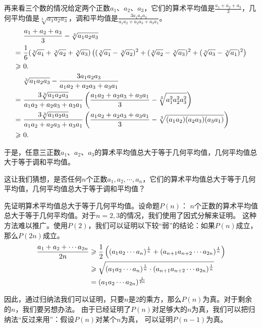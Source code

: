 \documentclass[12pt,UTF8]{ctexbook}
\begin{document}
再来看三个数的情况给定两个正数$a_1$、$a_2$、$a_3$，它们的算术平均值是$\frac{a_1 + a_2 + a_3}{3}$，几何平均值是$\sqrt[3]{a_1a_2a_3}$，调和平均值是$\frac{3a_1 a_2 a_3}{a_1 a_2 + a_2 a_3 + a_3 a_1}$。
\begin{align}
    &\frac{a_1 + a_2 + a_3}{3} - \sqrt[3]{a_1a_2a_3} \notag \\
    =\,\,& \frac{1}{6}(\sqrt[3]{a_1} + \sqrt[3]{a_2} + \sqrt[3]{a_3})\left((\sqrt[3]{a_1} - \sqrt[3]{a_2})^2 + (\sqrt[3]{a_2} - \sqrt[3]{a_3})^2 + (\sqrt[3]{a_3} - \sqrt[3]{a_1})^2\right) \notag \\
    \geqslant\,\,&0. \notag \\
    &\sqrt[3]{a_1a_2a_3} - \frac{3a_1 a_2 a_3}{a_1 a_2 + a_2 a_3 + a_3 a_1} \notag \\
    =\,\,& \frac{3\sqrt[3]{a_1a_2a_3}}{a_1 a_2 + a_2 a_3 + a_3 a_1}\left(\frac{a_1 a_2 + a_2 a_3 + a_3 a_1}{3} - \sqrt[3]{a_1^2a_2^2a_3^2}\right) \notag \\
    =\,\,& \frac{3\sqrt[3]{a_1a_2a_3}}{a_1 a_2 + a_2 a_3 + a_3 a_1}\left(\frac{a_1 a_2 + a_2 a_3 + a_3 a_1}{3} - \sqrt[3]{(a_1a_2)(a_2a_3)(a_3a_1)}\right) \notag \\
    \geqslant \,\,&0. \notag
\end{align}

于是，任意三正数$a_1$、$a_2$、$a_3$的算术平均值总大于等于几何平均值，几何平均值总大于等于调和平均值。

这让我们猜想，是否任何$n$个正数$a_1, a_2, \cdots , a_n$，它们的算术平均值总大于等于几何平均值，几何平均值总大于等于调和平均值？

先证明算术平均值总大于等于几何平均值。设命题$P(n)$：
$n$个正数的算术平均值总大于等于几何平均值。对于$n=2,3$的情况，我们使用了因式分解来证明。
这种方法难以推广。使用$P(2)$，我们可以证明以下较“弱”的结论：如果$P(n)$成立，那么$P(2n)$成立。
\begin{align}
    \frac{a_1 + a_2 + \cdots a_{2n}}{2n} &\geqslant \frac{1}{2}\left((a_1a_2\cdots a_{n})^{\frac{1}{n}} + (a_{n+1}a_{n+2}\cdots a_{2n})^{\frac{1}{n}} \right) \notag \\
    &\geqslant \sqrt{(a_1a_2\cdots a_{n})^{\frac{1}{n}} \cdot (a_{n+1}a_{n+2}\cdots a_{2n})^{\frac{1}{n}}} \notag \\
    &= (a_1a_2\cdots a_{2n})^{\frac{1}{2n}}\notag
\end{align}

因此，通过归纳法我们可以证明，只要$n$是$2$的乘方，那么$P(n)$为真。对于剩余的$n$，我们要另想办法。
由于已经证明了$P(n)$对足够大的$n$为真，我们可以把归纳法“反过来用”：假设$P(n)$对某个$n$为真，
可以证明$P(n-1)$为真。
\end{document}
